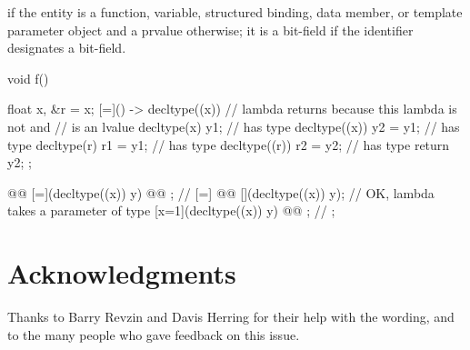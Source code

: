 \documentclass{wg21}
\begin{document}
if the entity is a function, variable, structured binding, data member, or
template parameter object
and a prvalue otherwise;
it is a bit-field if the identifier designates a bit-field.
\begin{example}
\begin{codeblock}
    void f() {
        float x, &r = x;
        [=]() -> decltype((x)) {      // lambda returns  because this lambda is not  and
            //  is an lvalue
            decltype(x) y1;             //  has type 
            decltype((x)) y2 = y1;      //  has type 
            decltype(r) r1 = y1;        //  has type 
            decltype((r)) r2 = y2;      //  has type 
            return y2;
        };

        @@
        [=](decltype((x)) y) {
              @@
        };       // 
        [=]{
            @@
            [](decltype((x)) y){};    // OK, lambda takes a parameter of type 
            [x=1](decltype((x)) y){
                @@
            }; // 
        };
    }
\end{codeblock}
\end{example}

\section{Acknowledgments}

Thanks to Barry Revzin and Davis Herring for their help with the wording, and to the many people who gave feedback on this
issue.




\end{document}
